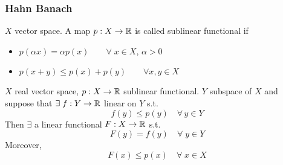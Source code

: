 \subsubsection*{Hahn Banach}

\begin{definition}
    \(X\) vector space. A map \(p: X \to \mathbb{R}\) is called sublinear functional if 
    \begin{itemize}
        \item \(p(\alpha x) = \alpha p(x) \qquad \forall \; x \in X\), \(\alpha >0\)
        \item \(p(x+y) \leq p(x) + p(y) \qquad \forall x, y \in X\)  
    \end{itemize}
\end{definition}

\begin{theorem}
    \(X\) real vector space, \(p: X \to \mathbb{R}\) sublinear functional. 
    \(Y\) subspace of \(X\) and suppose that \(\exists \; f: Y \to \mathbb{R} \) linear on \(Y\) s.t. 
    \[
        f(y) \leq p(y) \quad \forall \, y \in Y
    \]
    Then \(\exists\) a linear functional \(F: X \to \mathbb{R} \) s.t. 
    \[
        F(y) = f(y) \quad \forall \; y \in Y \tag*{\(F\) is an extension of \(f\)}
    \]
    Moreover,
    \[
        F(x) \leq p(x) \quad \forall \; x \in X
    \] 
\end{theorem}
